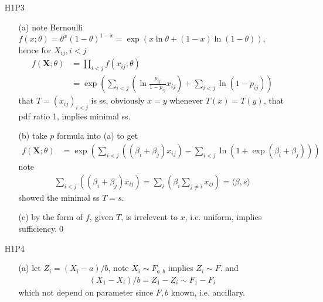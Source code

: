 \documentclass[paper=a4, fontsize=11pt]{scrartcl} %
\numberwithin{equation}{section} %
\numberwithin{figure}{section} %
\numberwithin{table}{section} %
\begin{document}
\begin{itemize}
\begin{itemize}
\begin{align}
		\end{align}\qed
		\item[(c)] let $g(x)=x^2$, that
		\begin{align}
			E[X^2(X-\mu)] = \sigma^2E[2X] = 2\mu\sigma^2\\
			E[X^3] = \mu E[X^2] + 2\mu\sigma^2 = \mu^3+ 3\mu\sigma^2
		\end{align}
		let $g(x)=x^3$, that
		\begin{align}
			E[X^3(X-\mu)] = \sigma^2 E[3X^2] = 3\sigma^2(\mu^2+\sigma^2)\\
			E[X^4] = \mu^4 + 6\mu^2\sigma^2+3\sigma^4
		\end{align}
	\end{itemize}
	\item[H1P3]
	\begin{itemize}
		\item[(a)] note Bernoulli $f(x;\theta) = \theta^x(1-\theta)^{1-x} = \exp(x\ln \theta +(1-x)\ln(1-\theta))$, hence for $X_{ij},i<j$
		\begin{align}
			f(\mathbf{X};\theta) &= \prod_{i<j} f(x_{ij};\theta)\\
				&= \exp( \sum_{i<j} (\ln\frac{p_{ij}}{1-p_{ij}}x_{ij})  + \sum_{i<j}\ln(1-p_{ij}) )
		\end{align}
		that $T=(x_{ij})_{i<j}$ is ss, obviously $x=y$ whenever $T(x)=T(y)$, that pdf ratio 1, implies minimal ss.
		\item[(b)] take $p$ formula into (a) to get
		\begin{align}
			f(\mathbf{X};\theta) &= \exp( \sum_{i<j}((\beta_i+\beta_j)x_{ij}) - \sum_{i<j} \ln(1+\exp(\beta_i+\beta_j))  )
		\end{align}
		note
		\begin{align}
			\sum_{i<j}((\beta_i+\beta_j)x_{ij}) = \sum_i (\beta_i \sum_{j\neq i} x_{ij}) =\langle \beta, s\rangle
		\end{align}
		showed the minimal ss $T=s$.
		\item[(c)] by the form of $f$, given $T$, is irrelevent to $x$, i.e. uniform, implies sufficiency.\qed
	\end{itemize}
	\item[H1P4]
	\begin{itemize}
		\item[(a)] let $Z_i = (X_i-a)/b$, note $X_i\sim F_{a,b}$ implies $Z_i\sim F$. and
		\begin{align}
			(X_1-X_i)/b = Z_1 - Z_i \sim F_1 -F_i
		\end{align}
		which not depend on parameter since $F,b$ known, i.e. ancillary.

\end{itemize}
\end{itemize}
\end{document}

